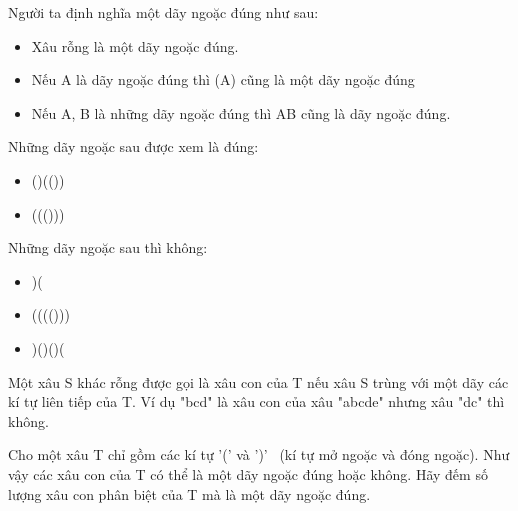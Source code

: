 Người ta định nghĩa một dãy ngoặc đúng như sau:  
\begin{itemize}
	\item     Xâu rỗng là một dãy ngoặc đúng.   
	\item     Nếu A là dãy ngoặc đúng thì (A) cũng là một dãy ngoặc đúng   
	\item     Nếu A, B là những dãy ngoặc đúng thì AB cũng là dãy ngoặc đúng.   
\end{itemize}

   Những dãy ngoặc sau được xem là đúng:  
\begin{itemize}
	\item     ()(())   
	\item     ((()))   
\end{itemize}

   Những dãy ngoặc sau thì không:  
\begin{itemize}
	\item     )(   
	\item     (((()))   
	\item     )()()(   
\end{itemize}

   Một xâu S khác rỗng được gọi là xâu con của T nếu xâu S trùng với một dãy các kí tự liên tiếp của T. Ví dụ "bcd" là xâu con của xâu "abcde" nhưng xâu "dc" thì không.  

   Cho một xâu T chỉ gồm các kí tự '(' và ')'  (kí tự mở ngoặc và đóng ngoặc). Như vậy các xâu con của T có thể là một dãy ngoặc đúng hoặc không. Hãy đếm số lượng xâu con phân biệt của T mà là một dãy ngoặc đúng.  

\